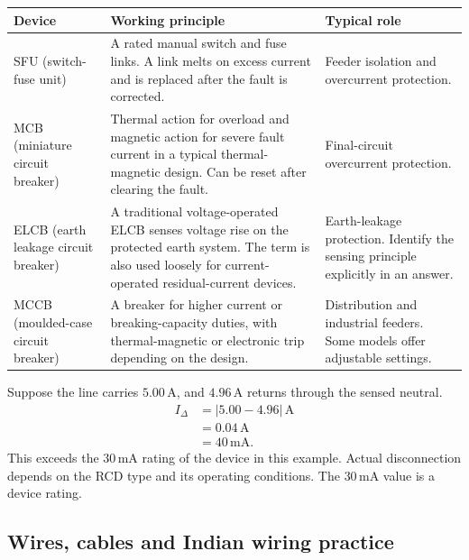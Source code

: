 \documentclass[12pt,a4paper]{article}
\begin{document}
\par\vspace{6pt}\noindent
\begin{tabularx}{\linewidth}{|B{3.0cm}|Y|Y|}\hline
Device & \textbf{Working principle} & \textbf{Typical role} \\ \hline
SFU (switch-fuse unit) & A rated manual switch and fuse links. A link melts on excess current and is replaced after the fault is corrected. & Feeder isolation and overcurrent protection. \\ \hline
MCB (miniature circuit breaker) & Thermal action for overload and magnetic action for severe fault current in a typical thermal-magnetic design. Can be reset after clearing the fault. & Final-circuit overcurrent protection. \\ \hline
ELCB (earth leakage circuit breaker) & A traditional voltage-operated ELCB senses voltage rise on the protected earth system. The term is also used loosely for current-operated residual-current devices. & Earth-leakage protection. Identify the sensing principle explicitly in an answer. \\ \hline
MCCB (moulded-case circuit breaker) & A breaker for higher current or breaking-capacity duties, with thermal-magnetic or electronic trip depending on the design. & Distribution and industrial feeders. Some models offer adjustable settings. \\ \hline
\end{tabularx}

\begin{tcolorbox}[examplebox,title={Reading an RCD example}]
Suppose the line carries \(5.00\,\mathrm A\), and \(4.96\,\mathrm A\) returns through the sensed neutral.
\[
\begin{aligned}
I_\Delta &= \lvert 5.00-4.96\rvert\,\mathrm A\\
         &= 0.04\,\mathrm A\\
         &= 40\,\mathrm{mA}.
\end{aligned}
\]
This exceeds the \(30\,\mathrm{mA}\) rating of the device in this example. Actual disconnection depends on the RCD type and its operating conditions. The \(30\,\mathrm{mA}\) value is a device rating.
\end{tcolorbox}

\subsection{Wires, cables and Indian wiring practice}
\end{document}
